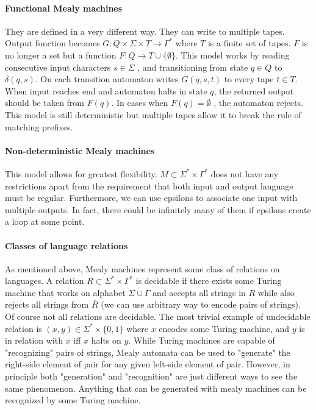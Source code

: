 \documentclass[12pt]{article}
\begin{document}
\paragraph{Functional Mealy machines} They are defined in a very different way. They can write to multiple   tapes. Output function becomes $G: Q \times \Sigma \times T \rightarrow \Gamma^*$ where $T$ is a finite set of tapes. $F$ is no longer a set but a function $F: Q \rightarrow T \cup \{\emptyset\}$. This model works by reading consecutive input characters $s \in \Sigma$ , and transitioning from state $q\in Q$ to $\delta(q,s)$. On each transition automaton writes  $G(q,s,t)$ to every tape $t \in T$. When input reaches end and automaton halts in state $q$, the returned output should be taken from $F(q)$. In cases when $F(q) = \emptyset$ , the automaton rejects. This model is still deterministic but multiple tapes allow it to break the rule of matching prefixes.


\paragraph{Non-deterministic Mealy machines} This model allows for greatest flexibility. $M \subset \Sigma^* \times \Gamma^*$ does not have any restrictions apart from the requirement that both input and output language must be regular. Furthermore, we can use epsilons to associate one input with multiple outputs. In fact, there could be infinitely many of them if epsilons create a loop at some point. 



\paragraph{Classes of language relations} As mentioned above, Mealy machines represent some class of relations on languages. A relation $R \subset \Sigma^* \times \Gamma^*$ is decidable if there exists some Turing machine that works on alphabet $\Sigma \cup \Gamma$ and accepts all strings in $R$ while also rejects all strings from $\overline{R}$ (we can use arbitrary way to encode pairs of strings). Of course not all relations are decidable. The most trivial example of undecidable relation is $(x,y)  \in \Sigma^* \times \{0,1\}$ where  $x$ encodes some Turing machine, and $y$ is in relation with $x$ iff $x$ halts on $y$. While Turing machines are capable of "recognizing" pairs of strings, Mealy automata can be used to "generate" the right-side element of pair for any given left-side element of pair. However, in principle both "generation" and "recognition" are just different ways to see the same phenomenon. Anything that can be generated with mealy machines can be recognized by some Turing machine. 
\end{document}
